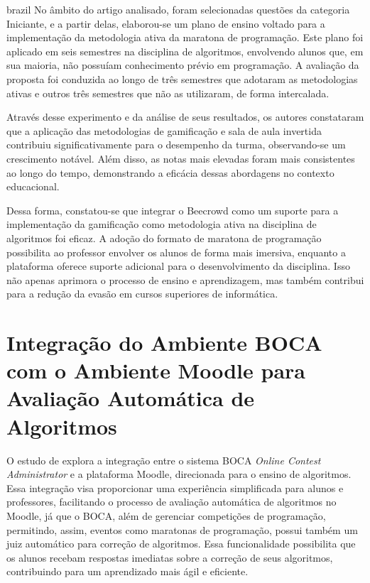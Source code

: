 \begin{otherlanguage*}{brazil}
No âmbito do artigo analisado, foram selecionadas questões da categoria Iniciante, e a partir delas, elaborou-se um plano de ensino voltado para a implementação da metodologia ativa da maratona de programação. Este plano foi aplicado em seis semestres na disciplina de algoritmos, envolvendo alunos que, em sua maioria, não possuíam conhecimento prévio em programação. A avaliação da proposta foi conduzida ao longo de três semestres que adotaram as metodologias ativas e outros três semestres que não as utilizaram, de forma intercalada. 

Através desse experimento e da análise de seus resultados, os autores constataram que a aplicação das metodologias de gamificação e sala de aula invertida contribuiu significativamente para o desempenho da turma, observando-se um crescimento notável. Além disso, as notas mais elevadas foram mais consistentes ao longo do tempo, demonstrando a eficácia dessas abordagens no contexto educacional.

Dessa forma, constatou-se que integrar o Beecrowd como um suporte para a implementação da gamificação como metodologia ativa na disciplina de algoritmos foi eficaz. A adoção do formato de maratona de programação possibilita ao professor envolver os alunos de forma mais imersiva, enquanto a plataforma oferece suporte adicional para o desenvolvimento da disciplina. Isso não apenas aprimora o processo de ensino e aprendizagem, mas também contribui para a redução da evasão em cursos superiores de informática.



\section{Integração do Ambiente BOCA com o Ambiente Moodle para Avaliação Automática de Algoritmos}

O estudo de \textcite{galasso} explora a integração entre o sistema BOCA \textit{Online Contest Administrator} e a plataforma Moodle, direcionada para o ensino de algoritmos. Essa integração visa proporcionar uma experiência simplificada para alunos e professores, facilitando o processo de avaliação automática de algoritmos no Moodle, já que o BOCA, além de gerenciar competições de programação, permitindo, assim, eventos como maratonas de programação, possui também um juiz automático para correção de algoritmos. Essa funcionalidade possibilita que os alunos recebam respostas imediatas sobre a correção de seus algoritmos, contribuindo para um aprendizado mais ágil e eficiente.


\end{otherlanguage*}
